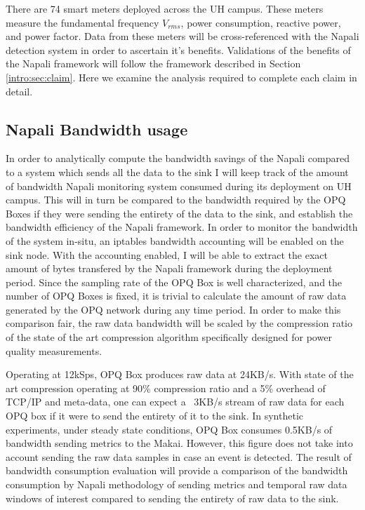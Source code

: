 There are 74 smart meters deployed across the UH campus. These meters measure the fundamental frequency $V_{rms}$, power consumption, reactive power, and power factor. Data from these meters will be cross-referenced with the Napali detection system in order to ascertain it's benefits. Validations of the benefits of the Napali framework will follow the framework described in Section \ref{intro:sec:claim}. Here we examine the analysis required to complete each claim in detail.

\subsection{Napali Bandwidth usage} \label{iexp:sec:band}
In order to analytically compute the bandwidth savings of the Napali compared to a system which sends all the data to the sink I will keep track of the amount of bandwidth Napali monitoring system consumed during its deployment on UH campus. This will in turn be compared to the bandwidth required by the OPQ Boxes if they were sending the entirety of the data to the sink, and establish the bandwidth efficiency of the Napali framework. In order to monitor the bandwidth of the system in-situ, an iptables bandwidth accounting will be enabled on the sink node. With the accounting enabled, I will be able to extract the exact amount of bytes transfered by the Napali framework during the deployment period. Since the sampling rate of the OPQ Box is well characterized, and the number of OPQ Boxes is fixed, it is trivial to calculate the amount of raw data generated by the OPQ network during any time period. In order to make this comparison fair, the raw data bandwidth will be scaled by the compression ratio of the state of the art compression algorithm specifically designed for power quality measurements.\cite{zhang2009new}

Operating at 12kSps, OPQ Box produces raw data at 24KB/s. With state of the art compression operating at 90\% compression ratio and a 5\% overhead of TCP/IP and meta-data, one can expect a ~3KB/s stream of raw data for each OPQ box if it were to send the entirety of it to the sink. In synthetic experiments, under steady state conditions, OPQ Box consumes 0.5KB/s of bandwidth sending metrics to the Makai. However, this figure does not take into account sending the raw data samples in case an event is detected. The result of bandwidth consumption evaluation will provide a comparison of the bandwidth consumption by Napali methodology of sending metrics and temporal raw data windows of interest compared to sending the entirety of raw data to the sink.

